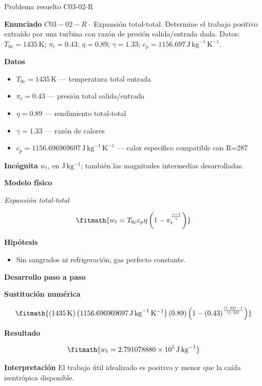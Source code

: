 \documentclass[10pt,openany]{book}
\begin{document}
\begin{studiumworked}{Problema resuelto C03-02-R}


\noindent\textbf{Enunciado}
\(C03-02-R \cdot\) Expansión total-total. Determine el trabajo positivo extraído por una turbina con razón de presión salida/entrada dada. Datos: \(T_{0e}=1435\, \mathrm{K}\); \(\pi_t=0.43\); \(\eta=0.89\); \(\gamma=1.33\); \(c_p=1156.697\, \mathrm{J}\,\mathrm{kg}^{-1}\,\mathrm{K}^{-1}\).

\noindent\textbf{Datos}
\begin{itemize}
\item $T_{0e} = 1435\,\mathrm{K}$ — temperatura total entrada
\item $\pi_t = 0.43$ — presión total salida/entrada
\item $\eta = 0.89$ — rendimiento total-total
\item $\gamma = 1.33$ — razón de calores
\item $c_p = 1156.696969697\,\mathrm{J}\,\mathrm{kg}^{-1}\,\mathrm{K}^{-1}$ — calor específico compatible con R=287
\end{itemize}

\noindent\textbf{Incógnita}
$w_t$, en $\mathrm{J\,kg^{-1}}$; también las magnitudes intermedias desarrolladas.

\noindent\textbf{Modelo físico}

\noindent\textit{Expansión total-total}

\[
\fitmath{w_t=T_{0e} c_p \eta \left(1 - \pi_t^{\frac{\gamma - 1}{\gamma}}\right)}
\]

\noindent\textbf{Hipótesis}
\begin{itemize}
\item Sin sangrados ni refrigeración, gas perfecto constante.
\end{itemize}

\noindent\textbf{Desarrollo paso a paso}



\noindent\textbf{Sustitución numérica}

\[
\fitmath{\left(1435\,\mathrm{K}\right) \left(1156.696969697\,\mathrm{J}\,\mathrm{kg}^{-1}\,\mathrm{K}^{-1}\right) \left(0.89\right) \left(1 - \left(0.43\right)^{\frac{\left(1.33\right) - 1}{\left(1.33\right)}}\right)}
\]

\noindent\textbf{Resultado}

\[
\fitmath{w_t=2.791078880\times10^{5}\,\mathrm{J}\,\mathrm{kg}^{-1}}
\]

\noindent\textbf{Interpretación}
El trabajo útil idealizado es positivo y menor que la caída isentrópica disponible.


\end{studiumworked}
\end{document}
